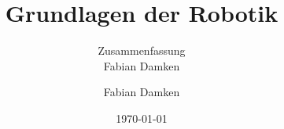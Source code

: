 \documentclass[a4paper, 11pt, accentcolor = tud3b]{tudreport}
\title{Grundlagen der Robotik}
\subtitle{Zusammenfassung \\ Fabian Damken}
\author{Fabian Damken}
\date{\today}
\begin{document}
	\maketitle
	\tableofcontents
	\listoftodos
\end{document}

